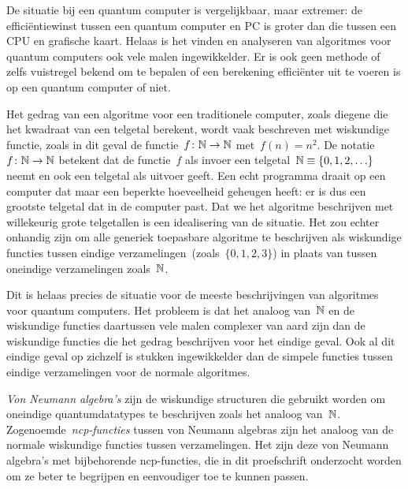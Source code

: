 De situatie bij een quantum computer is vergelijkbaar, maar extremer:
    de effici\"entiewinst tussen een quantum computer en PC
    is groter dan die tussen een CPU en grafische kaart.
Helaas is het vinden en analyseren van algoritmes voor quantum computers
    ook vele malen ingewikkelder.
Er is ook geen methode of zelfs vuistregel bekend
    om te bepalen of een berekening effici\"enter uit te voeren
    is op een quantum computer of niet.


Het gedrag van een algoritme voor een traditionele computer,
    zoals diegene die het kwadraat van een telgetal berekent,
    wordt vaak beschreven met wiskundige functie,
    zoals in dit geval de functie~$f\colon \mathbb{N} \to \mathbb{N}$
        met~$f(n) = n^2$.
De notatie~$f\colon \mathbb{N} \to \mathbb{N}$
    betekent dat de functie~$f$ als invoer
    een telgetal~$\mathbb{N} \equiv \{0, 1, 2, \ldots \}$
    neemt en ook een telgetal als uitvoer geeft.
Een echt programma draait op een computer
    dat maar een beperkte hoeveelheid geheugen heeft:
        er is dus een grootste telgetal dat in de computer past.
    Dat we het algoritme beschrijven
    met willekeurig grote telgetallen is een idealisering van de situatie.
Het zou echter onhandig zijn om alle generiek toepasbare algoritme
    te beschrijven als wiskundige functies tussen
    eindige verzamelingen~(zoals~$\{0, 1, 2, 3\}$)
    in plaats van tussen oneindige verzamelingen zoals~$\mathbb{N}$.

Dit is helaas precies de situatie voor de meeste beschrijvingen van
    algoritmes voor quantum computers.
Het probleem is dat het analoog van~$\mathbb{N}$
    en de wiskundige functies daartussen
    vele malen complexer van aard zijn
    dan de wiskundige functies die het gedrag
    beschrijven voor het eindige geval.
Ook al dit eindige geval op zichzelf is
    stukken ingewikkelder dan de simpele functies
    tussen eindige verzamelingen voor de normale algoritmes.

\emph{Von Neumann algebra's} zijn de wiskundige structuren
    die gebruikt worden om oneindige quantumdatatypes
    te beschrijven zoals het analoog van~$\mathbb{N}$.
Zogenoemde~\emph{ncp-functies} tussen von Neumann algebras
    zijn het analoog van de normale wiskundige functies
    tussen verzamelingen.
Het zijn deze von Neumann algebra's met bijbehorende
    ncp-functies, die in dit proefschrift onderzocht worden
    om ze beter te begrijpen en eenvoudiger toe te kunnen passen.

